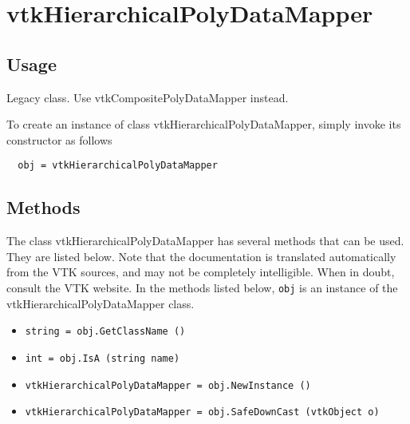 \section{vtkHierarchicalPolyDataMapper}

\subsection{Usage}

 Legacy class. Use vtkCompositePolyDataMapper instead.


To create an instance of class vtkHierarchicalPolyDataMapper, simply
invoke its constructor as follows
\begin{verbatim}
  obj = vtkHierarchicalPolyDataMapper
\end{verbatim}
\subsection{Methods}

The class vtkHierarchicalPolyDataMapper has several methods that can be used.
  They are listed below.
Note that the documentation is translated automatically from the VTK sources,
and may not be completely intelligible.  When in doubt, consult the VTK website.
In the methods listed below, \verb|obj| is an instance of the vtkHierarchicalPolyDataMapper class.
\begin{itemize}
\item  \verb|string = obj.GetClassName ()|

\item  \verb|int = obj.IsA (string name)|

\item  \verb|vtkHierarchicalPolyDataMapper = obj.NewInstance ()|

\item  \verb|vtkHierarchicalPolyDataMapper = obj.SafeDownCast (vtkObject o)|

\end{itemize}
